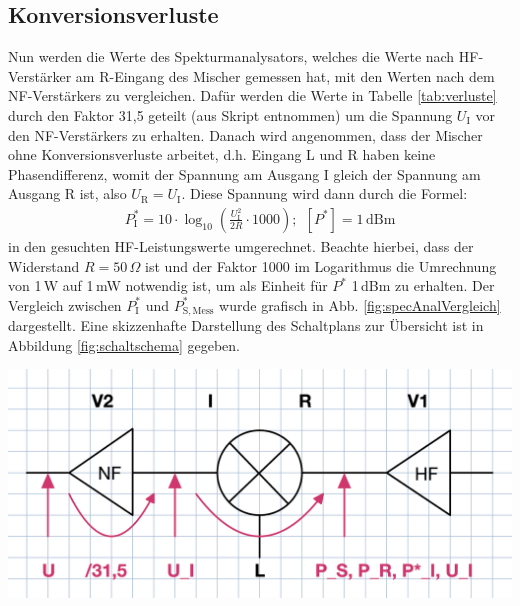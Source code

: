 \subsection{Konversionsverluste}
\label{sub:konversionsverluste}

Nun werden die Werte des Spekturmanalysators, welches die Werte nach HF-Verstärker am R-Eingang des Mischer gemessen hat, mit den Werten nach dem NF-Verstärkers zu vergleichen. Dafür werden die Werte in Tabelle \ref{tab:verluste} durch den Faktor 31,5 geteilt (aus Skript entnommen) um die Spannung $U_\mathrm{I}$ vor den NF-Verstärkers zu erhalten. Danach wird angenommen, dass der Mischer ohne Konversionsverluste arbeitet, d.h. Eingang L und R haben keine Phasendifferenz, womit der Spannung am Ausgang I gleich der Spannung am Ausgang R ist, also $U_\mathrm{R} = U_\mathrm{I}$. Diese Spannung wird dann durch die Formel:
\begin{gather}
    P^*_\mathrm{I} = 10\cdot\log_{10}\left(\frac{U_\mathrm{I}^2}{2R}\cdot1000\right);~~[P^*] = 1\,\mathrm{dBm}
\end{gather}
in den gesuchten HF-Leistungswerte umgerechnet. \cite{anleitung} Beachte hierbei, dass der Widerstand $R=50\,\Omega$ \cite{anleitung} ist und der Faktor 1000 im Logarithmus die Umrechnung von 1\,W auf 1\,mW notwendig ist, um als Einheit für $P^*$ 1\,dBm zu erhalten. Der Vergleich zwischen $P^*_\mathrm{I}$ und $P^*_\mathrm{S,Mess}$ wurde grafisch in Abb. \ref{fig:specAnalVergleich} dargestellt. Eine skizzenhafte Darstellung des Schaltplans zur Übersicht ist in Abbildung \ref{fig:schaltschema} gegeben. 

\begin{center}
    \captionsetup{type=figure}
    \includegraphics[scale=0.2]{Bilder/Schaltschema.png}
    \label{fig:schaltschema}
\end{center}

